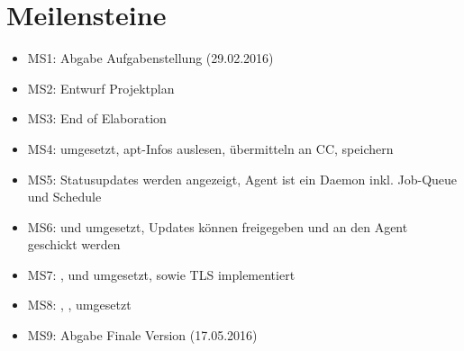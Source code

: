 \section{Meilensteine}

\begin{itemize}
    \item MS1: Abgabe Aufgabenstellung (29.02.2016)
    \item MS2: Entwurf Projektplan
    \item MS3: End of Elaboration
    \item MS4:  umgesetzt, apt-Infos auslesen, übermitteln an CC, speichern
    \item MS5: Statusupdates werden angezeigt, Agent ist ein Daemon inkl. Job-Queue und Schedule
    \item MS6:  und  umgesetzt, Updates können freigegeben und an den Agent geschickt werden
    \item MS7: ,  und  umgesetzt, sowie TLS implementiert
    \item MS8: , ,  umgesetzt
    \item MS9: Abgabe Finale Version (17.05.2016)
\end{itemize}